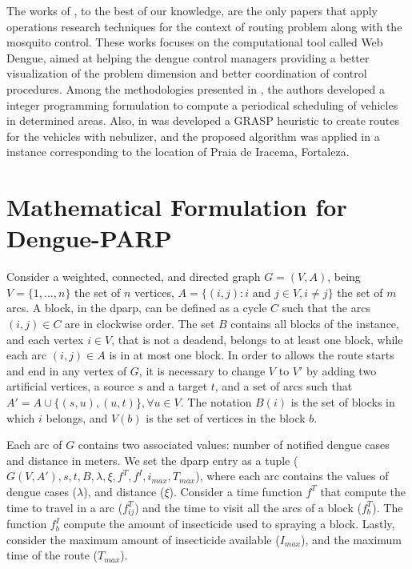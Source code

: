 \documentclass[a4paper,11pt]{article}
\begin{document}
The works of \cite{negreiros:2008,negreiros:2011,negreiros-2020}, to the best of
our knowledge, are the only papers that apply operations research techniques for
the context  of routing  problem along  with the  mosquito control.  These works
focuses on the computational tool called Web Dengue, aimed at helping the dengue
control managers providing  a better visualization of the  problem dimension and
better coordination of control procedures.  Among the methodologies presented in
\cite{negreiros:2008,negreiros:2011},   the   authors    developed   a   integer
programming  formulation  to compute  a  periodical  scheduling of  vehicles  in
determined areas. Also, in \cite{negreiros:2011} was developed a GRASP heuristic
to create routes for the vehicles with nebulizer, and the proposed algorithm was
applied  in a  instance  corresponding  to the  location  of  Praia de  Iracema,
Fortaleza.

\section{Mathematical Formulation for Dengue-PARP} \label{sec:formulation}

Consider a weighted, connected, and directed graph $G = (V, A)$, being $V = \{1,
\dots, n\}$ the  set of $n$ vertices, $A =  \{(i, j): i \text{ and }  j \in V, i
\neq j\}$ the set of $m$ arcs. A block, in the \gls{dparp}, can be defined as a
cycle $C$ such that the arcs $(i, j) \in C$ are in clockwise order. The set $B$
contains all blocks  of the instance, and each  vertex $i \in V$, that  is not a
deadend, belongs to at least one block, while  each arc $(i, j) \in A$ is in at
most one  block. In order to  allows the route starts  and end in any  vertex of
$G$, it is necessary to change $V$  to $V'$ by adding two artificial vertices, a
source $s$ and a  target $t$, and a  set of arcs such that
$A' = A  \cup \{(s, u), (u, t)\},  \forall u \in V$. The notation  $B(i)$ is the
set of  blocks in which $i$  belongs, and $V(b)$ is  the set of vertices  in the
block $b$.

Each arc of $G$ contains two associated values: number of notified dengue cases
and distance in meters.  We set the \gls{dparp} entry as a  tuple ($G(V, A'), s,
t, B, \lambda,  \xi, f^T, f^I, i_{max}, T_{max}$), where  each arc contains the
values  of dengue  cases  ($\lambda$),  and distance  ($\xi$).  Consider a  time
function $f^T$ that  compute the time to  travel in a arc  ($f^T_{ij}$) and the
time to visit all  the arcs of a block ($f^T_b$).  The function $f^I_b$ compute
the amount of insecticide used to spraying a block. Lastly, consider the maximum
amount of insecticide  available ($I_{max}$), and the maximum time  of the route
($T_{max}$).
\end{document}
